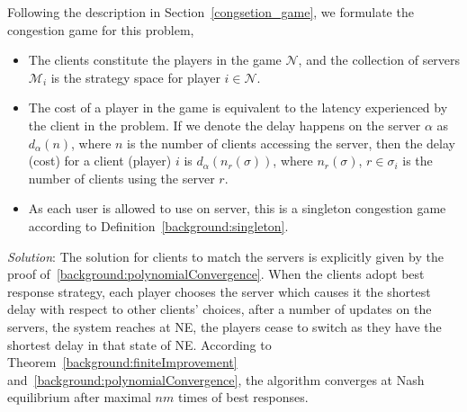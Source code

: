 Following the description in Section~\ref{congsetion_game}, we formulate the congestion game for this problem, 
\begin{itemize}
\item The clients constitute the players in the game $\mathcal{N}$, and the collection of servers $\mathcal{M}_i$ is the strategy space for player $i\in \mathcal{N}$.
\item The cost of a player in the game is equivalent to the latency experienced by the client in the problem.
If we denote the delay happens on the server $\alpha$ as $d_{\alpha}(n)$, where $n$ is the number of clients accessing the server, then the delay (cost) for a client (player) $i$ is $d_{\alpha}(n_r(\sigma))$, where $n_r(\sigma)$, $r\in \sigma_i$ is the number of clients using the server $r$.
\item As each user is allowed to use on server, this is a singleton congestion game according to Definition~\ref{background:singleton}.
\end{itemize}

\textit{Solution}: The solution for clients to match the servers is explicitly given by the proof of~\ref{background:polynomialConvergence}.
When the clients adopt best response strategy, \ie each player chooses the server which causes it the shortest delay with respect to other clients' choices, after a number of updates on the servers, the system reaches at NE, \ie the players cease to switch as they have the shortest delay in that state of NE. 
According to Theorem~\ref{background:finiteImprovement} and~\ref{background:polynomialConvergence}, the algorithm converges at Nash equilibrium after maximal $nm$ times of best responses.









